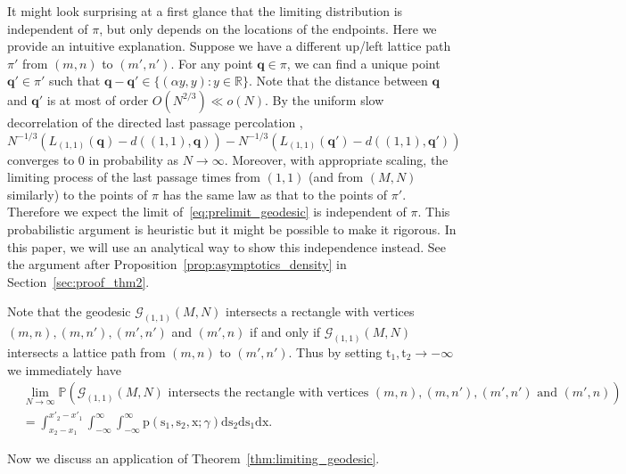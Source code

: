 \documentclass{article}
\numberwithin{equation}{section}
\newcommand{\gd}{{\mathcal{G}}}
\newcommand{\limp}{\mathrm{p}}
\newcommand{\prob}{\mathbb{P}}
\newcommand{\realR}{\mathbb{R}}
\begin{document}
It might look surprising at a first glance that the limiting distribution is independent of $\pi$, but only depends on the locations of the endpoints. Here we provide an intuitive explanation.  Suppose we have a different up/left  lattice path $\pi'$ from $(m,n)$ to $(m',n')$. For any point $\mathbf{q}\in\pi$, we can find a unique point $\mathbf{q'}\in\pi'$ such that $\mathbf{q}-\mathbf{q}'\in\{(\alpha y,y):y\in\realR\}$. Note that the distance between $\mathbf{q}$ and $\mathbf{q}'$ is at most of order $O(N^{2/3})\ll o(N)$. By the uniform slow decorrelation of the directed last passage percolation \cite{Corwin-Ferrari-Peche12,Corwin-Liu-Wang16}, $N^{-1/3}({L_{(1,1)}(\mathbf{q})-d((1,1),\mathbf{q})})-N^{-1/3}({L_{(1,1)}(\mathbf{q}')-d((1,1),\mathbf{q}')})$ converges to $0$ in probability as $N\to\infty$. Moreover, with appropriate scaling, the limiting process of the last passage times from $(1,1)$ (and from $(M,N)$ similarly) to the points of $\pi$ has the same law as that  to the points of $\pi'$. Therefore we expect the limit of~\eqref{eq:prelimit_geodesic} is independent of $\pi$. This probabilistic argument is heuristic but it might be possible to make it rigorous. In this paper, we will use an analytical way to show this independence instead. See the argument after Proposition~\ref{prop:asymptotics_density} in Section~\ref{sec:proof_thm2}.




Note that the geodesic $\gd_{(1,1)}{(M,N)}$ intersects a rectangle with vertices $(m,n), (m,n'), (m',n')$ and $(m',n)$ if and only if $\gd_{(1,1)}{(M,N)}$ intersects a lattice path from  $(m,n)$ to $(m',n')$.  Thus by setting $\mathrm{t}_1,\mathrm{t}_2\to-\infty$ we immediately have
	\begin{equation}
		\begin{split}
		&\lim_{N\to\infty} \prob
		\left(\gd_{(1,1)}{(M,N)} \text{ intersects the rectangle with vertices $(m,n), (m,n'), (m',n')$ and $(m',n)$}\right)\\
		&=\int_{x_2-x_1}^{x'_2-x'_1} \int_{-\infty}^\infty\int_{-\infty}^\infty
		\limp(\mathrm{s}_1,\mathrm{s}_2,\mathrm{x};\gamma)
		\mathrm{d}\mathrm{s}_2\mathrm{d}\mathrm{s}_1\mathrm{d}\mathrm{x}.
		\end{split}
	\end{equation}



\bigskip


Now we discuss an application of Theorem~\ref{thm:limiting_geodesic}. 
\end{document}
